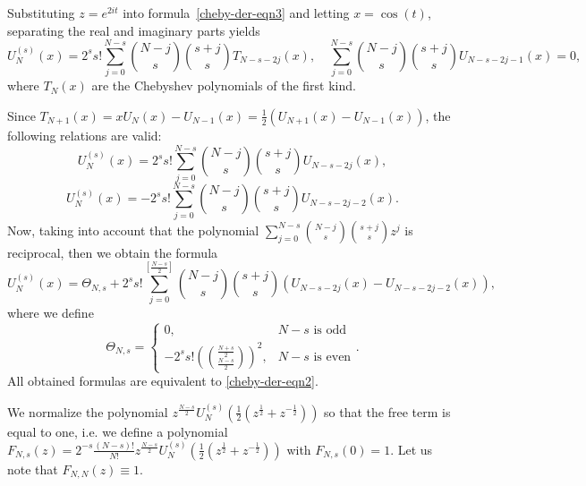 \documentclass[12pt]{article}
\newcommand{\pa}[1]{\left(#1\right)}
\begin{document}
Substituting $z = e^{2it}$ into formula~\eqref{cheby-der-eqn3} and letting $x = \cos(t)$, separating the real and imaginary parts yields
\begin{displaymath}
U_N^{(s)}(x) = {2^s}{s!}\sum_{j = 0}^{N - s} 
{N-j\choose s} {s+j\choose s}T_{N - s - 2j}(x),
\quad
 \sum_{j = 0}^{N - s} 
{N-j\choose s} {s+j\choose s} U_{N - s - 2j - 1}(x) = 0,
\end{displaymath}
where $T_N(x)$ are the Chebyshev polynomials of the first kind. 

Since $T_{N + 1}(x) = xU_N(x) - U_{N - 1}(x) = \frac{1}{2}\pa{U_{N + 1}(x) - U_{N - 1}(x)}$, the following relations are valid:
\begin{displaymath}
U_N^{(s)}(x) = {2^s}{s!}\sum_{j = 0}^{N - s} {N-j\choose s}{s+j\choose s}
U_{N - s - 2j}(x),
\end{displaymath}
\begin{displaymath}
U_N^{(s)}(x) = -{2^s}{s!}\sum_{j = 0}^{N - s} {N-j\choose s}{s+j\choose s}
U_{N - s - 2j-2}(x).
\end{displaymath}
Now, taking into account that the polynomial
$\displaystyle \sum_{j = 0}^{N - s} {N-j\choose s}{s+j\choose s}z^j$
is reciprocal, then we obtain the formula
\begin{displaymath}
U_N^{(s)}(x) = \Theta_{N,s} + {2^s}{s!}\sum_{j = 0}^{[\frac{N - s}2]} {N-j\choose s}{s+j\choose s} \pa{U_{N - s - 2j}(x) - U_{N - s - 2j - 2}(x)},
\end{displaymath}
where we define
\begin{displaymath}
\Theta_{N,s} = \begin{cases}
0, & N - s\mbox{ is odd} \\
-{2^s}{s!}\pa{\frac{N+s}2\choose\frac{N-s}2}^2, & N - s\mbox{ is even}
\end{cases}.
\end{displaymath}
All obtained formulas are equivalent to \eqref{cheby-der-eqn2}.


We normalize the polynomial $\displaystyle z^{\frac{N-s}{2}}U_N^{(s)}\pa{\frac{1}{2}\pa{z^{\frac{1}{2}} + z^{-\frac{1}{2}}}}$ so that the free term is equal to one, i.e. we define a polynomial $\displaystyle F_{N,s}(z) = 2^{-s}\frac{(N - s)!}{N!}z^{\frac{N-s}{2}}U_N^{(s)}\pa{\frac{1}{2}\pa{z^{\frac{1}{2}} + z^{-\frac{1}{2}}}}$ with $F_{N,s}(0) = 1$. Let us note that $F_{N,N}(z) \equiv 1$.
\end{document}
